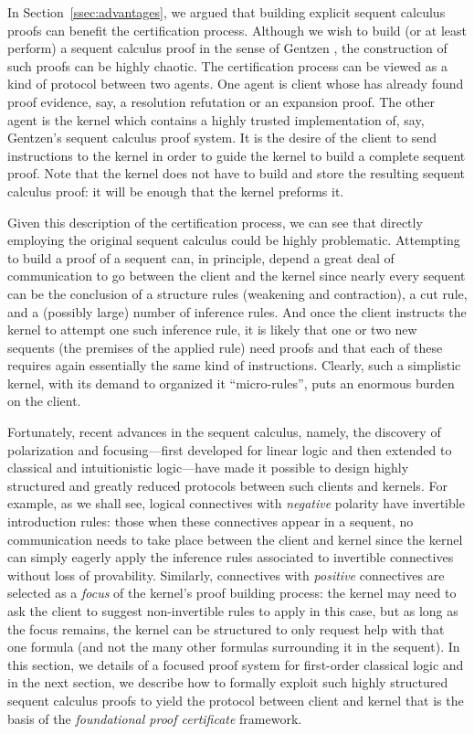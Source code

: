 \documentclass[a4paper,USenglish]{lipics-v2018}
\begin{document}
In Section~\ref{ssec:advantages}, we argued that building explicit
sequent calculus proofs can benefit the certification process.
%
Although we wish to build (or at least perform) a sequent calculus
proof in the sense of Gentzen \cite{gentzen35}, the construction of
such proofs can be highly chaotic.
%
The certification process can be viewed as a kind of protocol between
two agents.
%
One agent is client whose has already found proof evidence, say, a
resolution refutation or an expansion proof.
%
The other agent is the kernel which contains a highly trusted
implementation of, say, Gentzen's \LK sequent calculus proof system.
%
It is the desire of the client to send instructions to the kernel in
order to guide the kernel to build a complete sequent proof.
%
Note that the kernel does not have to build and store the resulting
sequent calculus proof: it will be enough that the kernel preforms
it.

Given this description of the certification process, we can see that
directly employing the original sequent calculus could be highly
problematic.
%
Attempting to build a proof of a sequent can, in principle, depend a
great deal of communication to go between the client and the kernel
since nearly every sequent can be the conclusion of a structure rules
(weakening and contraction), a cut rule, and a (possibly large)
number of inference rules.
%
And once the client instructs the kernel to attempt one such inference
rule, it is likely that one or two new sequents (the premises of the
applied rule) need proofs and that each of these requires again
essentially the same kind of instructions.
%
Clearly, such a simplistic kernel, with its demand to organized it
``micro-rules'',  puts an enormous burden on the client.

Fortunately, recent advances in the sequent calculus, namely, the
discovery of polarization and focusing---first developed for linear
logic \cite{andreoli92jlc,girard91mscs} and then extended to classical
and intuitionistic logic---have made it possible to design highly
structured and greatly reduced protocols between such clients and
kernels.
%
For example, as we shall see, logical connectives with \emph{negative}
polarity have invertible introduction rules: those when these
connectives appear in a sequent, no communication needs to take place
between the client and kernel since the kernel can simply eagerly
apply the inference rules associated to invertible connectives without
loss of provability.
%
Similarly, connectives with \emph{positive} connectives are selected
as a \emph{focus} of the kernel's proof building process: the kernel
may need to ask the client to suggest non-invertible rules to apply in
this case, but as long as the focus remains, the kernel can be
structured to only request help with that one formula (and not the
many other formulas surrounding it in the sequent).
%
In this section, we details of a focused proof system for
first-order classical logic and in the next section, we describe how
to formally exploit such highly structured sequent calculus proofs to
yield the protocol between client and kernel that is the basis of the
\emph{foundational proof certificate} framework.
\end{document}
